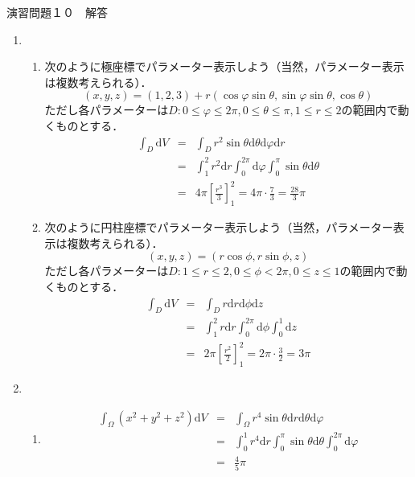 \documentclass{jarticle}
\def\d{\mathrm d}
\begin{document}
\begin{center} {\Large 演習問題１０　解答} \end{center}
  \begin{enumerate}
    \item
      \begin{enumerate}
        \item
          次のように極座標でパラメーター表示しよう（当然，パラメーター表示は複数考えられる）．
          \[ (x,y,z)=(1,2,3)+r(\cos\varphi\sin\theta,\sin\varphi\sin\theta,\cos\theta) \]
          ただし各パラメーターは$D: 0 \leq \varphi \leq 2\pi, 0 \leq \theta \leq \pi, 1 \leq r \leq 2$の範囲内で動くものとする． 
          \begin{eqnarray*}
            \int_D \d V & = & \int_D r^2 \sin\theta \d \theta \d \varphi \d r \\
            & = & \int_1^2 r^2 \d r \int_0^{2\pi} \d \varphi \int_0^{\pi} \sin \theta \d \theta \\
            & = & 4\pi \left[ \frac{r^3}{3} \right]_1^2 = 4\pi \cdot \frac{7}{3} = \frac{28}{3} \pi
          \end{eqnarray*}
        \item
          次のように円柱座標でパラメーター表示しよう（当然，パラメーター表示は複数考えられる）．
          \[ (x,y,z)=(r\cos\phi,r\sin\phi,z) \]
          ただし各パラメーターは$D: 1 \leq r \leq 2, 0 \leq \phi < 2\pi, 0 \leq z \leq 1$の範囲内で動くものとする．
          \begin{eqnarray*}
            \int_D \d V & = & \int_D r \d r \d \phi \d z \\
            & = & \int_1^2 r \d r \int_0^{2\pi} \d \phi \int_0^1 \d z \\
            & = & 2\pi \left[ \frac{r^2}{2} \right]_1^2 = 2\pi \cdot \frac{3}{2} = 3\pi
          \end{eqnarray*}
      \end{enumerate}
    \item
      \begin{enumerate}
        \item
          \begin{eqnarray*}
            \int_\Omega (x^2+y^2+z^2) \d V & = & \int_\Omega r^4 \sin\theta \d r \d \theta \d \varphi \\
            & = & \int_0^1 r^4 \d r \int_0^{\pi} \sin \theta \d \theta \int_0^{2\pi} \d \varphi \\
            & = & \frac{4}{5} \pi
          \end{eqnarray*}

\end{enumerate}
\end{enumerate}
\end{document}
